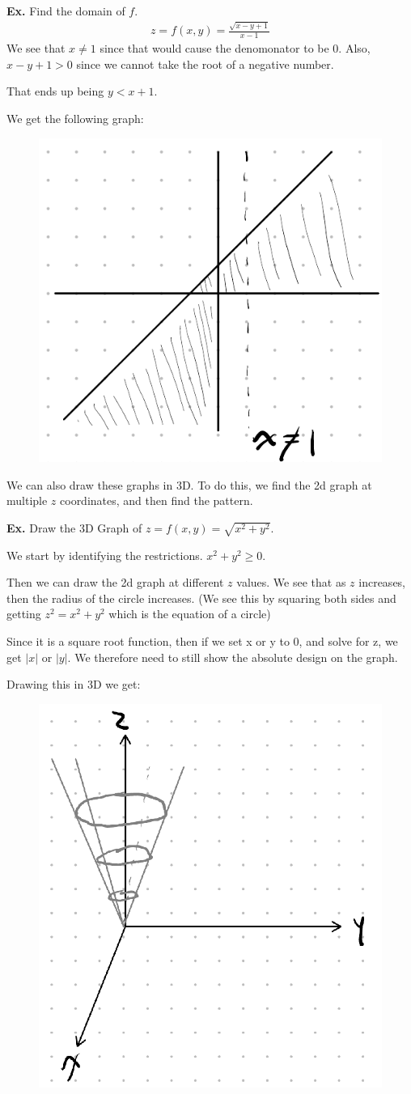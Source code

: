 \documentclass[12pt,letterpaper]{article} \usepackage{amsmath} \usepackage{graphicx}  \usepackage{longtable}  \usepackage{amssymb}
\begin{document}
    \begin{mdframed}
        \textbf{Ex. } Find the domain of $f$. 
        \begin{align*}
            z=f(x,y) = \frac{\sqrt{x-y+1}}{x-1}
        \end{align*}
        We see that $x\ne 1$ since that would cause the denomonator to be 0. Also, $x-y+1 > 0$ since we cannot take the root of a negative number. 

        That ends up being $y<x+1$. 

        We get the following graph:
        \begin{figure}[H]
            \centering
            \includegraphics[width=0.4\linewidth]{ex1.png}
        \end{figure}
    \end{mdframed}

    We can also draw these graphs in 3D. To do this, we find the 2d graph at multiple $z$ coordinates, and then find the pattern. 

    \begin{mdframed}
        \textbf{Ex. } Draw the 3D Graph of $z=f(x,y)=\sqrt{x^2+y^2}$.

        We start by identifying the restrictions. $x^2 + y^2 \ge 0$. 
        
        Then we can draw the 2d graph at different $z$ values. We see that as $z$ increases, then the radius of the circle increases. (We see this by squaring both sides and getting $z^2 = x^2 + y^2$ which is the equation of a circle)

        Since it is a square root function, then if we set x or y to 0, and solve for z, we get $|x|$ or $|y|$. We therefore need to still show the absolute design on the graph. 

        Drawing this in 3D we get:
        \begin{figure}[H]
            \centering
            \includegraphics[width=0.4\linewidth]{ex2.png}
        \end{figure}
    \end{mdframed}
\end{document}
